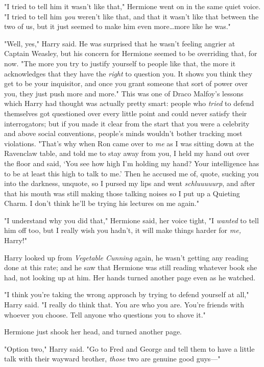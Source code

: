 "I tried to tell him it wasn't like that," Hermione went on in the same quiet
voice. "I tried to tell him \emph{you} weren't like that, and that it wasn't
like that between the two of us, but it just seemed to make him even
more…more like he was."

"Well, yes," Harry said. He was surprised that he wasn't feeling angrier at
Captain Weasley, but his concern for Hermione seemed to be overriding that, for
now. "The more you try to justify yourself to people like that, the more it
acknowledges that they have the \emph{right} to question you. It shows you
think they get to be your inquisitor, and once you grant someone that sort of
power over you, they just push more and more." This was one of Draco Malfoy's
lessons which Harry had thought was actually pretty smart: people who
\emph{tried} to defend themselves got questioned over every little point and
could never satisfy their interrogators; but if you made it clear from the
start that you were a celebrity and above social conventions, people's minds
wouldn't bother tracking most violations. "That's why when Ron came over to
\emph{me} as I was sitting down at the Ravenclaw table, and told me to stay
away from you, I held my hand out over the floor and said, `You see how high
I'm holding my hand? Your intelligence has to be at least this high to talk to
me.' Then he accused me of, quote, sucking you into the darkness, unquote, so I
pursed my lips and went \emph{schluuuuurp}, and after that his mouth was still
making those talking noises so I put up a Quieting Charm. I don't think he'll
be trying his lectures on me again."

"I understand why you did that," Hermione said, her voice tight, "I
\emph{wanted} to tell him off too, but I really wish you hadn't, it will make
things harder for \emph{me,} Harry!"

Harry looked up from \emph{Vegetable Cunning} again, he wasn't getting any
reading done at this rate; and he saw that Hermione was still reading whatever
book she had, not looking up at him. Her hands turned another page even as he
watched.

"I think you're taking the wrong approach by trying to defend yourself at all,"
Harry said. "I really do think that. You are who you are. You're friends with
whoever you choose. Tell anyone who questions you to shove it."

Hermione just shook her head, and turned another page.

"Option two," Harry said. "Go to Fred and George and tell them to have a little
talk with their wayward brother, \emph{those} two are genuine good guys---"

